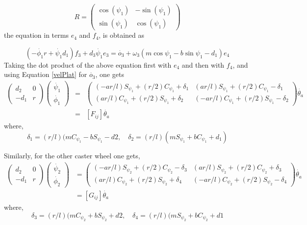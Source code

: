 \begin{equation}
\label{eqn:RotMatrix}
R=\begin{pmatrix}
\cos(\psi_1) & -\sin(\psi_1) \\
\sin(\psi_1) & \cos(\psi_1)
\end{pmatrix}
\end{equation}
 the equation in terms $e_4$ and $f_4$, is obtained as

\begin{equation}
(-\dot{\phi_1}r+\dot{\psi_1}d_1)f_3+d_3\dot{\psi_1}e_3=\dot{o_3}
+\omega_3(m\cos\psi_1-b\sin\psi_1-d_1)e_4
\end{equation} 
Taking the dot product of the above equation first with $e_4$ and then with $f_4$, and using Equation \ref{velPlat} for $\dot{o_3}$, one gets
\begin{eqnarray}
\label{unac2act1}
\begin{pmatrix}
d_2&0\\-d_1 &r
\end{pmatrix}
\begin{pmatrix}
\dot{\psi_1}\\ \dot{\phi_1}
\end{pmatrix}
&=&\begin{pmatrix}
(-ar/l)S_{\psi_1}+(r/2)C_{\psi_1}+\delta_1 & 
(ar/l)S_{\psi_1}+(r/2)C_{\psi_1}-\delta_1 \\
(ar/l)C_{\psi_1}+(r/2)S_{\psi_1}+\delta_2 & 
(-ar/l)C_{\psi_1}+(r/2)S_{\psi_1}-\delta_2 
\end{pmatrix}\dot{\theta_a}\nonumber \\
&=&[F_{ij}]\dot{\theta_a}
\end{eqnarray}
where, 
\[ \delta_1=(r/l)(mC_{\psi_1}-bS_{\psi_1}-d2, \quad  \delta_2=(r/l)(mS_{\psi_1}+bC_{\psi_1}+d_1) \]

Similarly, for the other caster wheel one gets,
\begin{align}
\label{unac2act2}
\begin{pmatrix}
d_2&0\\-d_1 &r
\end{pmatrix}
\begin{pmatrix}
\dot{\psi_2}\\ \dot{\phi_2}
\end{pmatrix}
&=\begin{pmatrix}
(-ar/l)S_{\psi_2}+(r/2)C_{\psi_2}-\delta_3 & 
(ar/l)S_{\psi_2}+(r/2)C_{\psi_2}+\delta_3 \\
(ar/l)C_{\psi_2}+(r/2)S_{\psi_2}+\delta_4 & 
(-ar/l)C_{\psi_2}+(r/2)S_{\psi_2}-\delta_4 
\end{pmatrix}\dot{\theta_a}\nonumber \\
&=[G_{ij}]\dot{\theta_a}
\end{align}
where, 
\[ \delta_3=(r/l)(mC_{\psi_2}+bS_{\psi_2}+d2, \quad  \delta_4=(r/l)(mS_{\psi_2}+bC_{\psi_2}+d1 \]




